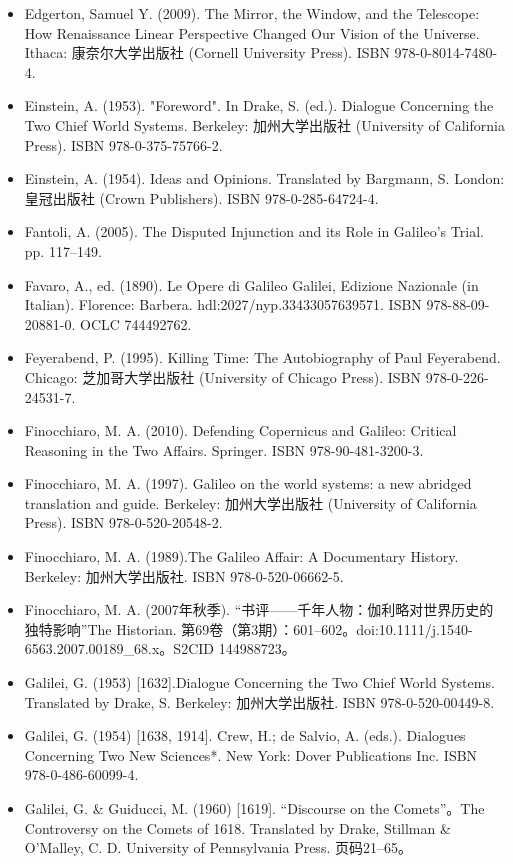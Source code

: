 \begin{itemize}
\item Edgerton, Samuel Y. (2009). The Mirror, the Window, and the Telescope: How Renaissance Linear Perspective Changed Our Vision of the Universe. Ithaca: 康奈尔大学出版社 (Cornell University Press). ISBN 978-0-8014-7480-4.  
\item Einstein, A. (1953). "Foreword". In Drake, S. (ed.). Dialogue Concerning the Two Chief World Systems. Berkeley: 加州大学出版社 (University of California Press). ISBN 978-0-375-75766-2.  
\item Einstein, A. (1954). Ideas and Opinions. Translated by Bargmann, S. London: 皇冠出版社 (Crown Publishers). ISBN 978-0-285-64724-4.  
\item Fantoli, A. (2005). The Disputed Injunction and its Role in Galileo's Trial. pp. 117–149.  
\item Favaro, A., ed. (1890). Le Opere di Galileo Galilei, Edizione Nazionale (in Italian). Florence: Barbera. hdl:2027/nyp.33433057639571. ISBN 978-88-09-20881-0. OCLC 744492762.  
\item Feyerabend, P. (1995). Killing Time: The Autobiography of Paul Feyerabend. Chicago: 芝加哥大学出版社 (University of Chicago Press). ISBN 978-0-226-24531-7.  
\item Finocchiaro, M. A. (2010). Defending Copernicus and Galileo: Critical Reasoning in the Two Affairs. Springer. ISBN 978-90-481-3200-3.  
\item Finocchiaro, M. A. (1997). Galileo on the world systems: a new abridged translation and guide. Berkeley: 加州大学出版社 (University of California Press). ISBN 978-0-520-20548-2.  
\item Finocchiaro, M. A. (1989).The Galileo Affair: A Documentary History. Berkeley: 加州大学出版社. ISBN 978-0-520-06662-5.  
\item Finocchiaro, M. A. (2007年秋季). “书评——千年人物：伽利略对世界历史的独特影响”The Historian. 第69卷（第3期）：601–602。doi:10.1111/j.1540-6563.2007.00189_68.x。S2CID 144988723。  
\item Galilei, G. (1953) [1632].Dialogue Concerning the Two Chief World Systems. Translated by Drake, S. Berkeley: 加州大学出版社. ISBN 978-0-520-00449-8.  
\item Galilei, G. (1954) [1638, 1914]. Crew, H.; de Salvio, A. (eds.). Dialogues Concerning Two New Sciences*. New York: Dover Publications Inc. ISBN 978-0-486-60099-4.  
\item Galilei, G. & Guiducci, M. (1960) [1619]. “Discourse on the Comets”。The Controversy on the Comets of 1618. Translated by Drake, Stillman & O'Malley, C. D. University of Pennsylvania Press. 页码21–65。  

\end{itemize}
